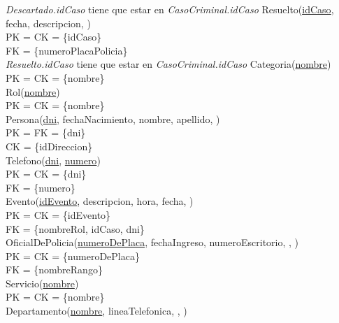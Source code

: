 \documentclass[10pt,a4paper]{article}
\begin{document}
\newline
\textit{Descartado.idCaso} tiene que estar en \textit{CasoCriminal.idCaso}
\newline
\newline
Resuelto(\underline{\underline{idCaso}}, fecha, descripcion, )\\ 
	PK = CK = \{idCaso\}\\ 
	FK = \{numeroPlacaPolicia\}\\ 	
\newline
\textit{Resuelto.idCaso} tiene que estar en \textit{CasoCriminal.idCaso}
\newline
\newline
Categoria(\underline{nombre})\\ 
	PK = CK = \{nombre\}\\ 
\newline
Rol(\underline{nombre})\\ 
	PK = CK = \{nombre\}\\ 
\newline
Persona(\underline{dni}, fechaNacimiento, nombre, apellido, )\\ 
	PK = FK = \{dni\}\\ 
	CK = \{idDireccion\}\\ 
\newline
Telefono(\underline{\underline{dni}}, \underline{numero})\\ 
	PK = CK = \{dni\}\\ 
	FK = \{numero\}\\ 
\newline
Evento(\underline{idEvento}, descripcion, hora, fecha, )\\ 
	PK = CK  = \{idEvento\}\\ 
	FK = \{nombreRol, idCaso, dni\}\\
\newline
OficialDePolicia(\underline{numeroDePlaca}, fechaIngreso, numeroEscritorio, , )\\
	PK = CK = \{numeroDePlaca\}\\ 
	FK = \{nombreRango\}\\
\newline
Servicio(\underline{nombre})\\ 
	PK = CK = \{nombre\}\\ 
\newline
Departamento(\underline{nombre}, lineaTelefonica, , )\\ 
\end{document}
